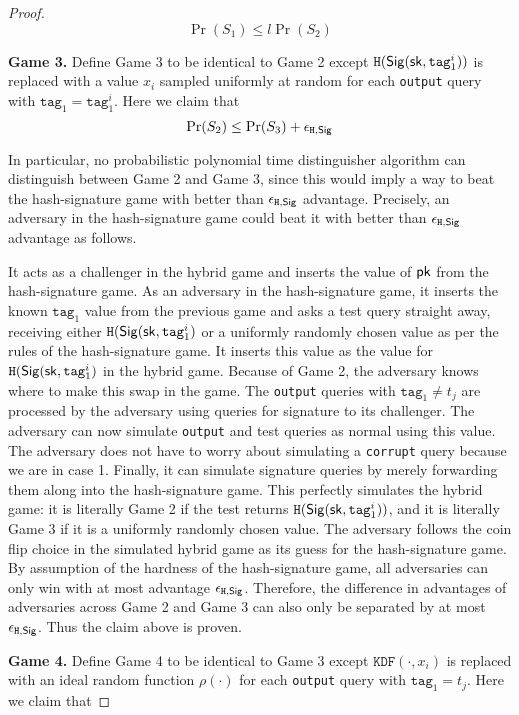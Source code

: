 \documentclass{article}
\begin{document}
\begin{proof}
$$
\Pr(S_1) \le l \Pr(S_2)
$$


\noindent \textbf{Game 3.} Define Game 3 to be identical to Game 2 except $\texttt{H}(\mathsf{Sig}(\mathsf{sk}, \texttt{tag}_1^i))$ is replaced with a value $x_i$ sampled uniformly at random for each  \texttt{output} query with $\texttt{tag}_1 = \texttt{tag}_1^i$. Here we claim that
$$\Pr(S_2) \le  \Pr(S_3) + \epsilon_{\texttt{H}, \mathsf{Sig}}$$

In particular, no probabilistic polynomial time distinguisher algorithm can distinguish between Game 2 and Game 3, since this would imply a way to beat the hash-signature game with better than $\epsilon_{\texttt{H}, \mathsf{Sig}}$ advantage. Precisely, an adversary in the hash-signature game could beat it with better than $\epsilon_{\texttt{H}, \mathsf{Sig}}$ advantage as follows. 

It acts as a challenger in the hybrid game and inserts the value of $\mathsf{pk}$ from the hash-signature game. As an adversary in the hash-signature game, it inserts the known $\texttt{tag}_1$ value from the previous game and asks a test query straight away, receiving either $ \texttt{H}(\mathsf{Sig} (\mathsf{sk}, \texttt{tag}_1^i)$ or a uniformly randomly chosen value as per the rules of the hash-signature game. It inserts this value as the value for $ \texttt{H}(\mathsf{Sig} (\mathsf{sk}, \texttt{tag}_1^i)$ in the hybrid game. Because of Game 2, the adversary knows where to make this swap in the game. The \texttt{output} queries with $\texttt{tag}_1 \neq t_j$ are processed by the adversary using queries for signature to its challenger.  The adversary can now simulate \texttt{output} and test queries as normal using this value. The adversary does not have to worry about simulating a \texttt{corrupt} query because we are in case 1. Finally, it can simulate signature queries by merely forwarding them along into the hash-signature game. This perfectly simulates the hybrid game: it is literally Game 2 if the test returns $ \texttt{H}(\mathsf{Sig} (\mathsf{sk}, \texttt{tag}_1^i))$, and it is literally Game 3 if it is a uniformly randomly chosen value. The adversary follows the coin flip choice in the simulated hybrid game as its guess for the hash-signature game. By assumption of the hardness of the hash-signature game, all adversaries can only win with at most advantage $\epsilon_{\texttt{H}, \mathsf{Sig}}$. Therefore, the difference in advantages of adversaries across Game 2 and Game 3 can also only be separated by at most $\epsilon_{\texttt{H}, \mathsf{Sig}}$. Thus the claim above is proven.

\noindent \textbf{Game 4.} Define Game 4 to be identical to Game 3 except 
$\texttt{KDF}(\cdot, x_i)$ is replaced with an ideal random function $\rho(\cdot)$ for each \texttt{output} query with $\texttt{tag}_1 =t_j$. Here we claim that


\end{proof}
\end{document}
